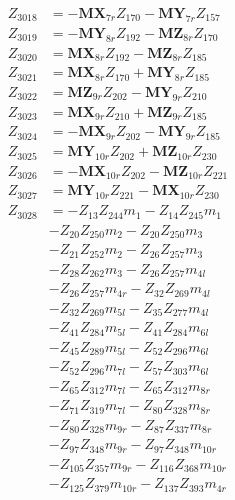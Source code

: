 \begin{multicols}{2}
\begin{align}
Z_{3018} &= - \mathbf{MX}_{7r}Z_{170} - \mathbf{MY}_{7r}Z_{157} \nonumber \\
Z_{3019} &= - \mathbf{MY}_{8r}Z_{192} - \mathbf{MZ}_{8r}Z_{170} \nonumber \\
Z_{3020} &= \mathbf{MX}_{8r}Z_{192} - \mathbf{MZ}_{8r}Z_{185} \nonumber \\
Z_{3021} &= \mathbf{MX}_{8r}Z_{170} + \mathbf{MY}_{8r}Z_{185} \nonumber \\
Z_{3022} &= \mathbf{MZ}_{9r}Z_{202} - \mathbf{MY}_{9r}Z_{210} \nonumber \\
Z_{3023} &= \mathbf{MX}_{9r}Z_{210} + \mathbf{MZ}_{9r}Z_{185} \nonumber \\
Z_{3024} &= - \mathbf{MX}_{9r}Z_{202} - \mathbf{MY}_{9r}Z_{185} \nonumber \\
Z_{3025} &= \mathbf{MY}_{10r}Z_{202} + \mathbf{MZ}_{10r}Z_{230} \nonumber \\
Z_{3026} &= - \mathbf{MX}_{10r}Z_{202} - \mathbf{MZ}_{10r}Z_{221} \nonumber \\
Z_{3027} &= \mathbf{MY}_{10r}Z_{221} - \mathbf{MX}_{10r}Z_{230} \nonumber \\
Z_{3028} &= - Z_{13}Z_{244}m_1 - Z_{14}Z_{245}m_1  \nonumber \\
&- Z_{20}Z_{250}m_2 - Z_{20}Z_{250}m_3  \nonumber \\
&- Z_{21}Z_{252}m_2 - Z_{26}Z_{257}m_3  \nonumber \\
&- Z_{28}Z_{262}m_3 - Z_{26}Z_{257}m_{4l}  \nonumber \\
&- Z_{26}Z_{257}m_{4r} - Z_{32}Z_{269}m_{4l}  \nonumber \\
&- Z_{32}Z_{269}m_{5l} - Z_{35}Z_{277}m_{4l}  \nonumber \\
&- Z_{41}Z_{284}m_{5l} - Z_{41}Z_{284}m_{6l}  \nonumber \\
&- Z_{45}Z_{289}m_{5l} - Z_{52}Z_{296}m_{6l}  \nonumber \\
&- Z_{52}Z_{296}m_{7l} - Z_{57}Z_{303}m_{6l}  \nonumber \\
&- Z_{65}Z_{312}m_{7l} - Z_{65}Z_{312}m_{8r}  \nonumber \\
&- Z_{71}Z_{319}m_{7l} - Z_{80}Z_{328}m_{8r}  \nonumber \\
&- Z_{80}Z_{328}m_{9r} - Z_{87}Z_{337}m_{8r}  \nonumber \\
&- Z_{97}Z_{348}m_{9r} - Z_{97}Z_{348}m_{10r}  \nonumber \\
&- Z_{105}Z_{357}m_{9r} - Z_{116}Z_{368}m_{10r}  \nonumber \\
&- Z_{125}Z_{379}m_{10r} - Z_{137}Z_{393}m_{4r}  \nonumber \\

\end{align}
\end{multicols}
